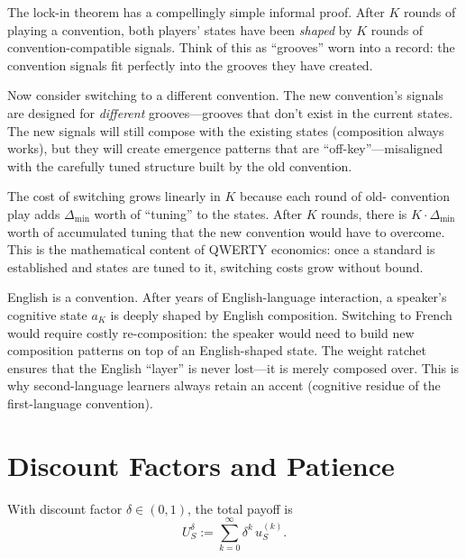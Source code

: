 \begin{remark}
\label{rem:lock-in-intuition}
The lock-in theorem has a compellingly simple informal proof.  After $K$
rounds of playing a convention, both players' states have been \emph{shaped}
by $K$ rounds of convention-compatible signals.  Think of this as ``grooves''
worn into a record: the convention signals fit perfectly into the grooves
they have created.

Now consider switching to a different convention.  The new convention's
signals are designed for \emph{different} grooves---grooves that don't exist
in the current states.  The new signals will still compose with the existing
states (composition always works), but they will create emergence patterns
that are ``off-key''---misaligned with the carefully tuned structure built
by the old convention.

The cost of switching grows linearly in $K$ because each round of old-
convention play adds $\Delta_{\min}$ worth of ``tuning'' to the states.
After $K$ rounds, there is $K \cdot \Delta_{\min}$ worth of accumulated
tuning that the new convention would have to overcome.  This is the
mathematical content of QWERTY economics: once a standard is established
and states are tuned to it, switching costs grow without bound.
\end{remark}

\begin{example}
\label{ex:natural-language-convention}
English is a convention.  After years of English-language interaction, a
speaker's cognitive state $a_K$ is deeply shaped by English composition.
Switching to French would require costly re-composition: the speaker would
need to build new composition patterns on top of an English-shaped state.
The weight ratchet ensures that the English ``layer'' is never lost---it is
merely composed over.  This is why second-language learners always retain an
accent (cognitive residue of the first-language convention).
\end{example}


\section{Discount Factors and Patience}

\begin{definition}
\label{def:discounted-rmg}
With discount factor $\delta \in (0,1)$, the total payoff is
\[
  U_S^\delta := \sum_{k=0}^{\infty} \delta^k \, u_S^{(k)}.
\]
\end{definition}

